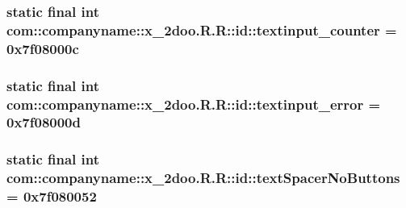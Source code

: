 \hypertarget{classcom_1_1companyname_1_1x__2doo_1_1_r_1_1id_71345845548f835eca48743f755afe51}{
\subsubsection[{textinput\_\-counter}]{\setlength{\rightskip}{0pt plus 5cm}static final int com::companyname::x\_\-2doo.R.R::id::textinput\_\-counter = 0x7f08000c}}
\label{classcom_1_1companyname_1_1x__2doo_1_1_r_1_1id_71345845548f835eca48743f755afe51}


\hypertarget{classcom_1_1companyname_1_1x__2doo_1_1_r_1_1id_b2dc693bcd3d0994ce1d1b47ab0c5a08}{
\subsubsection[{textinput\_\-error}]{\setlength{\rightskip}{0pt plus 5cm}static final int com::companyname::x\_\-2doo.R.R::id::textinput\_\-error = 0x7f08000d}}
\label{classcom_1_1companyname_1_1x__2doo_1_1_r_1_1id_b2dc693bcd3d0994ce1d1b47ab0c5a08}


\hypertarget{classcom_1_1companyname_1_1x__2doo_1_1_r_1_1id_961dbf9011a9dd6fd7b77a7a67f6628c}{
\subsubsection[{textSpacerNoButtons}]{\setlength{\rightskip}{0pt plus 5cm}static final int com::companyname::x\_\-2doo.R.R::id::textSpacerNoButtons = 0x7f080052}}
\label{classcom_1_1companyname_1_1x__2doo_1_1_r_1_1id_961dbf9011a9dd6fd7b77a7a67f6628c}


